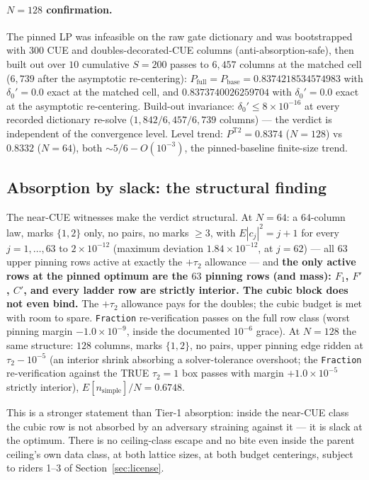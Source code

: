 \documentclass[11pt]{article}
\theoremstyle{plain}
\theoremstyle{definition}
\theoremstyle{remark}
\begin{document}
\paragraph{$N = 128$ confirmation.}
The pinned LP was infeasible on the raw gate dictionary and was bootstrapped with
$300$ CUE and doubles-decorated-CUE columns (anti-absorption-safe), then built
out over $10$ cumulative $S = 200$ passes to $6{,}457$ columns at the matched
cell ($6{,}739$ after the asymptotic re-centering):
$P_{\mathrm{full}} = P_{\mathrm{base}} = 0.8374218534574983$ with
$\delta_0' = 0.0$ exact at the matched cell, and $0.8373740026259704$ with
$\delta_0' = 0.0$ exact at the asymptotic re-centering. Build-out invariance:
$\delta_0' \le 8 \times 10^{-16}$ at every recorded dictionary re-solve
($1{,}842 / 6{,}457 / 6{,}739$ columns) --- the verdict is independent of the
convergence level. Level trend: $P^{\mathrm{T2}} = 0.8374$ ($N = 128$) vs
$0.8332$ ($N = 64$), both ${\sim}5/6 - O(10^{-3})$, the pinned-baseline
finite-size trend.

\subsection{Absorption by slack: the structural finding}
\label{sec:slack}

The near-CUE witnesses make the verdict structural. At $N = 64$: a $64$-column
law, marks $\{1, 2\}$ only, no pairs, no marks $\ge 3$, with
$E|c_j|^2 = j + 1$ for every $j = 1, \ldots, 63$ to $2 \times 10^{-12}$ (maximum
deviation $1.84 \times 10^{-12}$, at $j = 62$) --- all $63$ upper pinning rows
active at exactly the $+\tau_2$ allowance --- and \textbf{the only active rows at
the pinned optimum are the $63$ pinning rows (and mass): $F_1$, $F'$, $C'$, and
every ladder row are strictly interior. The cubic block does not even bind.} The
$+\tau_2$ allowance pays for the doubles; the cubic budget is met with room to
spare. \texttt{Fraction} re-verification passes on the full row class (worst
pinning margin $-1.0 \times 10^{-9}$, inside the documented $10^{-6}$ grace). At
$N = 128$ the same structure: $128$ columns, marks $\{1, 2\}$, no pairs, upper
pinning edge ridden at $\tau_2 - 10^{-5}$ (an interior shrink absorbing a
solver-tolerance overshoot; the \texttt{Fraction} re-verification against the TRUE
$\tau_2 = 1$ box passes with margin $+1.0 \times 10^{-5}$ strictly interior),
$E[n_{\mathrm{simple}}]/N = 0.6748$.

This is a stronger statement than Tier-1 absorption: inside the near-CUE class
the cubic row is not absorbed by an adversary straining against it --- it is
slack at the optimum. There is no ceiling-class escape and no bite even inside
the parent ceiling's own data class, at both lattice sizes, at both budget
centerings, subject to riders 1--3 of Section~\ref{sec:license}.
\end{document}
